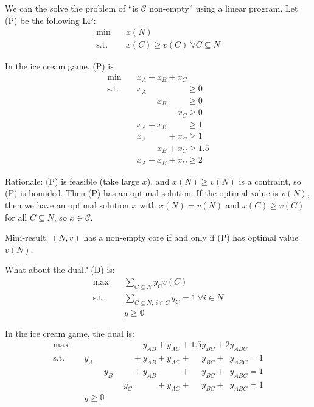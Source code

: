 \documentclass[12pt,letterpaper]{report}
\begin{document}
We can the solve the problem of ``is $\mathcal{C}$ non-empty'' using a linear program.
Let (P) be the following LP:
\begin{align*}
  \min \quad & x(N) \\
  \text{s.t.} \quad & x(C) \geq v(C) \ \forall C \subseteq N
\end{align*}

\begin{ex}
  In the ice cream game, (P) is
  \begin{align*}
    \min \quad & x_A + x_B + x_C \\
    \text{s.t.} \quad
    & x_A \phantom{{}+ x_B + x_C} \geq 0 \\
    & \phantom{x_A +{}} x_B \phantom{{}+ x_C} \geq 0 \\
    & \phantom{x_A + x_B +{}} x_C \geq 0 \\
    & x_A + x_B \phantom{{}+ x_C} \geq 1 \\
    & x_A \phantom{{}+ x_B} {}+ x_C \geq 1 \\
    & \phantom{x_A +{}} x_B + x_C \geq 1.5 \\
    & x_A + x_B + x_C \geq 2
  \end{align*}
\end{ex}

Rationale: (P) is feasible (take large $x$), and $x(N) \geq v(N)$ is a contraint, so (P) is bounded.
Then (P) has an optimal solution.
If the optimal value is $v(N)$, then we have an optimal solution $x$ with $x(N) = v(N)$ and
$x(C) \geq v(C)$ for all $C \subseteq N$, so $x \in \mathcal{C}$.

Mini-result: $(N, v)$ has a non-empty core if and only if (P) has optimal value $v(N)$.

What about the dual?
(D) is:
\begin{align*}
  \max \quad & \sum_{C \subseteq N} y_C v(C) \\
  \text{s.t.} \quad
  & \sum_{C \subseteq N, \ i \in C} y_C = 1 \ \forall i \in N \\
  & y \geq \mathbb{0}
\end{align*}

\begin{ex}
  In the ice cream game, the dual is:
  \begin{align*}
    \max \quad & \phantom{y_A + y_B + y_C +{}} y_{AB} + y_{AC} + 1.5y_{BC} + 2y_{ABC} \\
    \text{s.t.} \quad
    & y_A \phantom{{}+ y_B + y_C} {}+ y_{AB} + y_{AC} + \phantom{1.5}y_{BC} + \phantom{2}y_{ABC}
      = 1 \\
    & \phantom{y_A + {}} y_B \phantom{{}+ y_C} {}+ y_{AB} \phantom{{}+ y_{AC}} + \phantom{1.5}y_{BC}
      + \phantom{2}y_{ABC} = 1 \\
    & \phantom{y_A + y_B +{}} y_C \phantom{{}+ y_{AB}} + y_{AC} + \phantom{1.5}y_{BC}
      + \phantom{2}y_{ABC} = 1 \\
    & y \geq \mathbb{0}
  \end{align*}
\end{ex}
\end{document}
